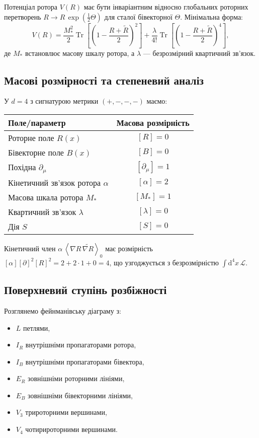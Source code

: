 \documentclass[11pt,a4paper]{article}
\numberwithin{equation}{section}
\theoremstyle{plain}
\theoremstyle{definition}
\theoremstyle{remark}
\DeclareMathOperator{\Tr}{Tr}
\newcommand{\dd}{\mathrm{d}}
\newcommand{\rev}[1]{\widetilde{#1}}        %
\newcommand{\grade}[2]{\left\langle #1 \right\rangle_{#2}}
\newcommand{\Lag}{\mathcal{L}}              %
\begin{document}
Потенціал ротора $V(R)$ має бути інваріантним відносно глобальних роторних перетворень $R\to R\,\exp(\tfrac12 \Theta)$ для сталої бівекторної $\Theta$. Мінімальна форма:
\begin{equation}
V(R) = \frac{M_*^2}{2}\Tr\left[\left(1 - \frac{R+\rev{R}}{2}\right)^2\right] + \frac{\lambda}{4!}\Tr\left[\left(1 - \frac{R+\rev{R}}{2}\right)^4\right],
\label{eq:V-rotor}
\end{equation}
де $M_*$ встановлює масову шкалу ротора, а $\lambda$ — безрозмірний квартичний зв’язок.

\subsection{Масові розмірності та степеневий аналіз}

У $d=4$ з сигнатурою метрики $(+,-,-,-)$ маємо:
\begin{center}
\begin{tabular}{lc}
\toprule
Поле/параметр & Масова розмірність \\
\midrule
Роторне поле $R(x)$ & $[R]=0$ \\
Бівекторне поле $B(x)$ & $[B]=0$ \\
Похідна $\partial_\mu$ & $[\partial_\mu]=1$ \\
Кінетичний зв’язок ротора $\alpha$ & $[\alpha]=2$ \\
Масова шкала ротора $M_*$ & $[M_*]=1$ \\
Квартичний зв’язок $\lambda$ & $[\lambda]=0$ \\
Дія $S$ & $[S]=0$ \\
\bottomrule
\end{tabular}
\end{center}

Кінетичний член $\alpha\,\grade{\nabla R\,\rev{\nabla R}}{0}$ має розмірність $[\alpha][\partial]^2[R]^2 = 2+2\cdot 1 + 0 = 4$, що узгоджується з безрозмірністю $\int \dd^4x\,\Lag$.

\subsection{Поверхневий ступінь розбіжності}

Розглянемо фейнманівську діаграму з:
\begin{itemize}
  \item $L$ петлями,
  \item $I_R$ внутрішніми пропагаторами ротора,
  \item $I_B$ внутрішніми пропагаторами бівектора,
  \item $E_R$ зовнішніми роторними лініями,
  \item $E_B$ зовнішніми бівекторними лініями,
  \item $V_3$ трироторними вершинами,
  \item $V_4$ чотирироторними вершинами.
\end{itemize}
\end{document}
